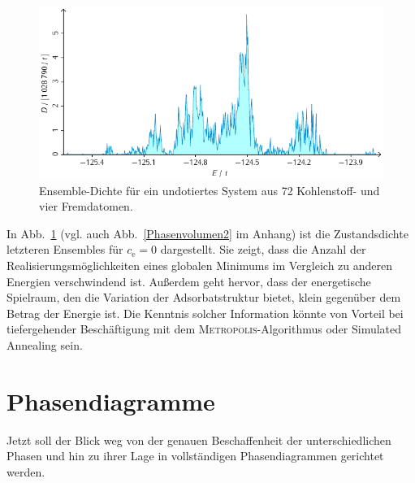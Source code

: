 \documentclass[a4paper, 10pt, twoside, openany]{book} %
\def \cE {c_\mathrm{e}}
\begin{document}
\begin{figure}
    \includegraphics[width=\textwidth]{Abbildungen/Zustandsdichten/75.pdf}
    \caption[Ensemble-Dichte ohne Dotierung]{Ensemble-Dichte für ein undotiertes System aus 72 Kohlenstoff- und vier Fremdatomen.}
    \label{Phasenvolumen}
\end{figure}
%
In Abb.~\ref{Phasenvolumen} (vgl. auch Abb.~\ref{Phasenvolumen2} im Anhang) ist die Zustandsdichte letzteren Ensembles für $\cE = 0$ dargestellt. Sie zeigt, dass die Anzahl der Realisierungsmöglichkeiten eines globalen Minimums im Vergleich zu anderen Energien verschwindend ist. Außerdem geht hervor, dass der energetische Spielraum, den die Variation der Adsorbatstruktur bietet, klein gegenüber dem Betrag der Energie ist. Die Kenntnis solcher Information könnte von Vorteil bei tiefergehender Beschäftigung mit dem \textsc{Metropolis}-Algorithmus oder Simulated Annealing sein.

\section{Phasendiagramme}
\label{Phasendiagramme}

Jetzt soll der Blick weg von der genauen Beschaffenheit der unterschiedlichen Phasen und hin zu ihrer Lage in vollständigen Phasendiagrammen gerichtet werden.
\end{document}
